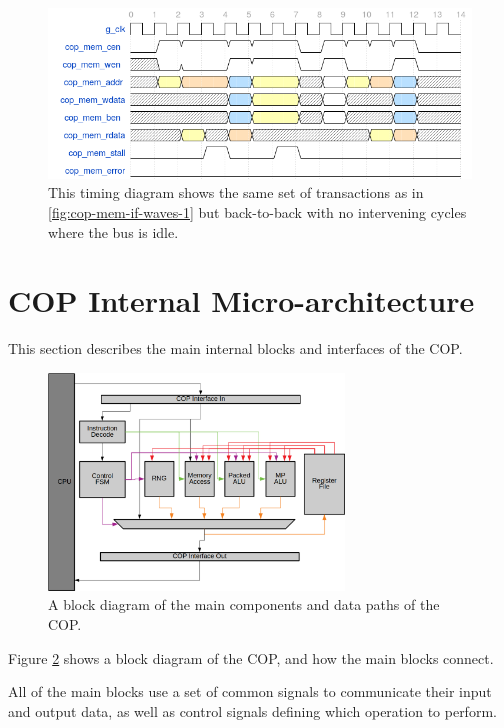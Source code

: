 \documentclass{article}
\begin{document}
\begin{figure}[h]
\centering
\includegraphics[width=\textwidth]{./diagrams/cop-mem-if-2.png}
\caption{This timing diagram shows the same set of transactions as in
\ref{fig:cop-mem-if-waves-1} but back-to-back with no intervening cycles
where the bus is idle.}
\label{fig:cop-mem-if-waves-2}
\end{figure}


\section{COP Internal Micro-architecture}
\label{sec:cop-microarch}

This section describes the main internal blocks and interfaces of the COP.

\begin{figure}[H]
\centering
\includegraphics[width=0.7\textwidth]{diagrams/cop-block-diagram.png}
\caption{A block diagram of the main components and data paths of
the COP.}
\label{fig:cop-block-diagram}
\end{figure}

Figure \ref{fig:cop-block-diagram} shows a block diagram of the COP,
and how the main blocks connect.

All of the main blocks use a set of common signals to communicate their
input and output data, as well as control signals defining which operation
to perform.
\end{document}
